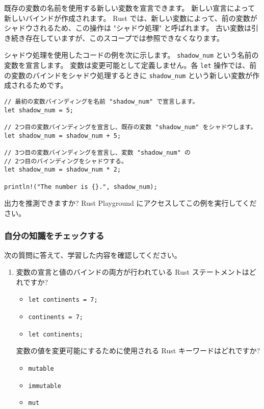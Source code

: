 既存の変数の名前を使用する新しい変数を宣言できます。 新しい宣言によって新しいバインドが作成されます。 Rust では、新しい変数によって、前の変数がシャドウされるため、この操作は "シャドウ処理" と呼ばれます。 古い変数は引き続き存在していますが、このスコープでは参照できなくなります。

シャドウ処理を使用したコードの例を次に示します。 \texttt{shadow\_num} という名前の変数を宣言します。 変数は変更可能として定義しません。各 \texttt{let} 操作では、前の変数のバインドをシャドウ処理するときに \texttt{shadow\_num} という新しい変数が作成されるためです。


\begin{lstlisting}[numbers=none]
// 最初の変数バインディングを名前 "shadow_num" で宣言します。
let shadow_num = 5;

// 2つ目の変数バインディングを宣言し、既存の変数 "shadow_num" をシャドウします。
let shadow_num = shadow_num + 5; 

// 3つ目の変数バインディングを宣言し、変数 "shadow_num" の
// 2つ目のバインディングをシャドウする。
let shadow_num = shadow_num * 2; 

println!("The number is {}.", shadow_num);
\end{lstlisting}

出力を推測できますか? Rust Playground にアクセスしてこの例を実行してください。

\subsubsection{自分の知識をチェックする}

次の質問に答えて、学習した内容を確認してください。 


\begin{enumerate}
\item 変数の宣言と値のバインドの両方が行われている Rust ステートメントはどれですか?
\begin{itemize}
\item \texttt{let continents = 7;}

\item \texttt{continents = 7;}

\item \texttt{let continents;}
\end{itemize}


変数の値を変更可能にするために使用される Rust キーワードはどれですか?
\begin{itemize}
\item \texttt{mutable}

\item \texttt{immutable}

\item \texttt{mut}
\end{itemize}
\end{enumerate}
